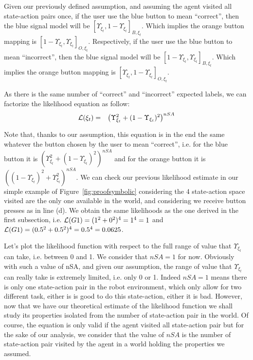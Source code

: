 Given our previously defined assumption, and assuming the agent visited all state-action pairs once, if the user use the blue button to mean ``correct'', then the blue signal model will be $[\Upsilon_{\xi_t},1-\Upsilon_{\xi_t}]_{B,\xi_t}$. Which implies the orange button mapping is $[1-\Upsilon_{\xi_t},\Upsilon_{\xi_t}]_{O,\xi_t}$. Respectively, if the user use the blue button to mean ``incorrect'', then the blue signal model will be $[1-\Upsilon_{\xi_t},\Upsilon_{\xi_t}]_{B,\xi_t}$. Which implies the orange button mapping is $[\Upsilon_{\xi_t},1-\Upsilon_{\xi_t}]_{O,\xi_t}$. 

As there is the same number of ``correct'' and ``incorrect'' expected labels, we can factorize the likelihood equation as follow:
%
\begin{eqnarray}
\mathcal{L}(\xi_t) &=& \left(\Upsilon_{\xi_t}^2 + (1-\Upsilon_{\xi_t})^2 \right)^{nSA}
\label{eq:likelihoodproof}
\end{eqnarray}

Note that, thanks to our assumption, this equation is in the end the same whatever the button chosen by the user to mean ``correct'', i.e. for the blue button it is $\left(\Upsilon_{\xi_t}^2 + (1-\Upsilon_{\xi_t})^2 \right)^{nSA}$ and for the orange button it is $\left((1- \Upsilon_{\xi_t})^2 + \Upsilon_{\xi_t}^2 \right)^{nSA}$. We can check our previous likelihood estimate in our simple example of Figure~\ref{fig:proofsymbolic} considering the 4 state-action space visited are the only one available in the world, and considering we receive button presses as in line (d). We obtain the same likelihoods as the one derived in the first subsection, i.e. $\mathcal{L}(G1) = (1^2 + 0^2)^4 = 1^4 = 1$ and $\mathcal{L}(G1) = (0.5^2 + 0.5^2)^4 = 0.5^4 = 0.0625$.

Let's plot the likelihood function with respect to the full range of value that $\Upsilon_{\xi_t}$ can take, i.e. between 0 and 1. We consider that $nSA = 1$ for now. Obviously with such a value of nSA, and given our assumption, the range of value that $\Upsilon_{\xi_t}$ can really take is extremely limited, i.e. only 0 or 1. Indeed $nSA = 1$ means there is only one state-action pair in the robot environment, which only allow for two different task, either is is good to do this state-action, either it is bad. However, now that we have our theoretical estimate of the likelihood function we shall study its properties isolated from the number of state-action pair in the world. Of course, the equation is only valid if the agent visited all state-action pair but for the sake of our analysis, we consider that the value of $nSA$ is the number of state-action pair visited by the agent in a world holding the properties we assumed.

